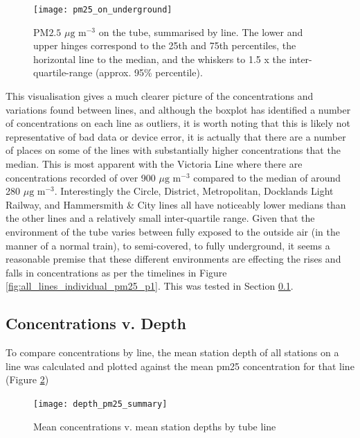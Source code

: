 \begin{figure}[H]
\centering
\texttt{[image: pm25\_on\_underground]}
\caption{PM${2.5}$ $\mu \text{g m}^{-3}$ on the tube, summarised by line. The lower and upper hinges correspond to the 25th and 75th percentiles, the horizontal line to the median, and the whiskers to 1.5 x the inter-quartile-range (approx. 95\% percentile).}
\label{fig:boxplot_pm25_lines}
\end{figure}

This visualisation gives a much clearer picture of the concentrations and variations found between lines, and although the boxplot has identified a number of concentrations on each line as outliers, it is worth noting that this is likely not representative of bad data or device error, it is actually that there are a number of places on some of the lines with substantially higher concentrations that the median. This is most apparent with the Victoria Line where there are concentrations recorded of over 900  $\mu \text{g m}^{-3}$ compared to the median of around 280  $\mu \text{g m}^{-3}$. Interestingly the Circle, District, Metropolitan, Docklands Light Railway, and Hammersmith \& City lines all have noticeably lower medians than the other lines and a relatively small inter-quartile range. Given that the environment of the tube varies between fully exposed to the outside air (in the manner of a normal train), to semi-covered, to fully underground, it seems a reasonable premise that these different environments are effecting the rises and falls in concentrations as per the timelines in Figure \ref{fig:all_lines_individual_pm25_p1}. This was tested in Section \ref{subsec:concentrations_v_depth}.

\subsection{Concentrations v. Depth}
\label{subsec:concentrations_v_depth}

To compare concentrations by line, the mean station depth of all stations on a line was calculated and plotted against the mean \gls{pm25} concentration for that line (Figure \ref{fig:concentrations_depth_summary})

\begin{figure}[H]
\centering
\texttt{[image: depth\_pm25\_summary]}
\caption{Mean concentrations v. mean station depths by tube line}
\label{fig:concentrations_depth_summary}
\end{figure}

